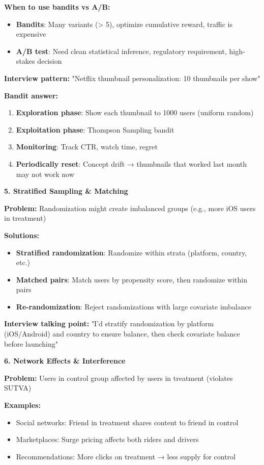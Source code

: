 \documentclass[10pt]{article}
\begin{document}
\textbf{When to use bandits vs A/B:}
\begin{itemize}
\item \textbf{Bandits}: Many variants (> 5), optimize cumulative reward, traffic is expensive
\item \textbf{A/B test}: Need clean statistical inference, regulatory requirement, high-stakes decision
\end{itemize}

\textbf{Interview pattern:} "Netflix thumbnail personalization: 10 thumbnails per show"

\textbf{Bandit answer:}
\begin{enumerate}
\item \textbf{Exploration phase}: Show each thumbnail to 1000 users (uniform random)
\item \textbf{Exploitation phase}: Thompson Sampling bandit
\item \textbf{Monitoring}: Track CTR, watch time, regret
\item \textbf{Periodically reset}: Concept drift → thumbnails that worked last month may not work now
\end{enumerate}

\textbf{5. Stratified Sampling \& Matching}

\textbf{Problem:} Randomization might create imbalanced groups (e.g., more iOS users in treatment)

\textbf{Solutions:}
\begin{itemize}
\item \textbf{Stratified randomization}: Randomize within strata (platform, country, etc.)
\item \textbf{Matched pairs}: Match users by propensity score, then randomize within pairs
\item \textbf{Re-randomization}: Reject randomizations with large covariate imbalance
\end{itemize}

\textbf{Interview talking point:} "I'd stratify randomization by platform (iOS/Android) and country to ensure balance, then check covariate balance before launching"

\textbf{6. Network Effects \& Interference}

\textbf{Problem:} Users in control group affected by users in treatment (violates SUTVA)

\textbf{Examples:}
\begin{itemize}
\item Social networks: Friend in treatment shares content to friend in control
\item Marketplaces: Surge pricing affects both riders and drivers
\item Recommendations: More clicks on treatment → less supply for control
\end{itemize}
\end{document}
